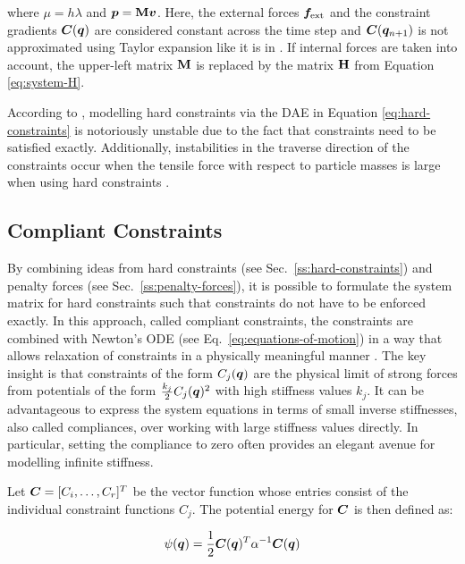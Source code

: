 \noindent where $\mu = h\lambda$ and $\bm{p} = \mathbf{M}\bm{v}$. Here, the external forces $\bm{f}_{\text{ext}}$ and the constraint gradients $\bm{C}(\bm{q})$ are 
considered constant across the time step and $\bm{C}(\bm{q}_{n+1})$ is not approximated using Taylor expansion like it is in 
\cite{baraff1998}. If internal forces are taken into account, the upper-left matrix $\mathbf{M}$ is replaced by the matrix $\mathbf{H}$ from 
Equation \ref{eq:system-H}. 

According to \cite{servin2006}, modelling hard constraints via the DAE in Equation \ref{eq:hard-constraints} is notoriously unstable due to 
the fact that constraints need to be satisfied exactly. Additionally, instabilities in the traverse direction of the constraints occur when 
the tensile force with respect to particle masses is large when using hard constraints \cite{tournier2015}.

\subsection{Compliant Constraints}\label{ss:compliant-constraints}
By combining ideas from hard constraints (see Sec.\ \ref{ss:hard-constraints}) and penalty forces (see Sec.\ \ref{ss:penalty-forces}), it is possible to 
formulate the system matrix for hard constraints such that constraints do not have to be enforced exactly. In this approach, called compliant 
constraints, the constraints are combined with Newton's ODE (see Eq.\ \ref{eq:equations-of-motion}) in a way that allows relaxation of constraints in a 
physically meaningful manner \cite{servin2006}. The key insight is that constraints 
of the form $C_j(\bm{q})$ are the physical limit of strong forces from potentials of the form $\frac{k_j}{2}C_j(\bm{q})^2$ with 
high stiffness values $k_j$. It can be advantageous to express the system equations in terms of small inverse stiffnesses, also 
called compliances, over working with large stiffness values directly. In particular, setting the compliance to zero often provides
an elegant avenue for modelling infinite stiffness. 

Let $\bm{C} = [C_i, \ldots, C_r]^T$ be the vector function whose entries consist of the individual constraint 
functions $C_j$. The potential energy for $\bm{C}$ is then defined as:

\begin{equation}\label{eq:compliant-potential}
    \psi(\bm{q}) = \frac{1}{2}\bm{C}(\bm{q})^T \mathbf{\alpha}^{-1}\bm{C}(\bm{q})
\end{equation}

